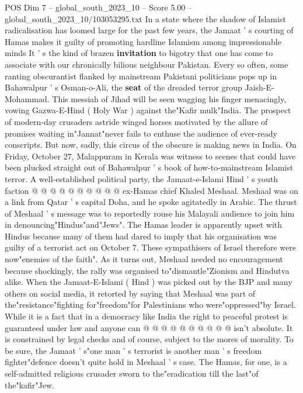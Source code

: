 \begin{textsample}{POS Dim 7 – global\_south\_2023\_10 – Score 5.00 – global\_south\_2023\_10/103053295.txt}  \label{ex:f7_pos_387}
In a state where the shadow of Islamist radicalisation has loomed large for the past few years, the Jamaat ' s courting of Hamas makes it guilty of promoting hardline Islamism among impressionable minds It ' s the kind of brazen \textbf{invitation} to bigotry that one has come to associate with our chronically bilious neighbour Pakistan.
Every so often, some ranting obscurantist flanked by mainstream Pakistani politicians pops up in Bahawalpur ' s Osman-o-Ali, the \textbf{seat} of the dreaded terror group Jaish-E-Mohammad.
This messiah of Jihad will be seen wagging his finger menacingly, vowing Gazwa-E-Hind ( Holy War ) against the"Kafir mulk"India.
The prospect of modern-day crusaders astride winged horses motivated by the allure of promises waiting in"Jannat"never fails to enthuse the audience of ever-ready conscripts.
But now, sadly, this circus of the obscure is making news in India.
On Friday, October 27, Malappuram in Kerala was witness to scenes that could have been plucked straight out of Bahawalpur ' s book of how-to-mainstream Islamist terror.
A well-established political party, the Jamaat-e-Islami Hind ' s youth faction @ @ @ @ @ @ @ @ @ @ ex-Hamas chief Khaled Meshaal.
Meshaal was on a link from Qatar ' s capital Doha, and he spoke agitatedly in Arabic.
The thrust of Meshaal ' s message was to reportedly rouse his Malayali audience to join him in denouncing"Hindus"and"Jews".
The Hamas leader is apparently upset with Hindus because many of them had dared to imply that his organisation was guilty of a terrorist act on October 7.
These sympathisers of Israel therefore were now"enemies of the faith".
As it turns out, Meshaal needed no encouragement because shockingly, the rally was organised to"dismantle"Zionism and Hindutva alike.
When the Jamaat-E-Islami ( Hind ) was picked out by the BJP and many others on social media, it retorted by saying that Meshaal was part of the"resistance"fighting for"freedom"for Palestinians who were"oppressed"by Israel.
While it is a fact that in a democracy like India the right to peaceful protest is guaranteed under law and anyone can @ @ @ @ @ @ @ @ @ @ isn't absolute.
It is constrained by legal checks and of course, subject to the mores of morality.
To be sure, the Jamaat ' s"one man ' s terrorist is another man ' s freedom fighter"defence doesn't quite hold in Meshaal ' s case.
The Hamas, for one, is a self-admitted religious crusader sworn to the"eradication till the last"of the"kafir"Jew.

\end{textsample}
